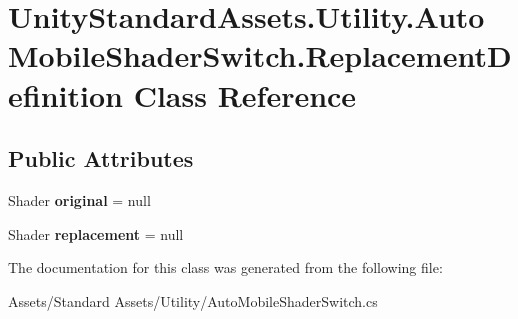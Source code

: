 \hypertarget{class_unity_standard_assets_1_1_utility_1_1_auto_mobile_shader_switch_1_1_replacement_definition}{}\section{Unity\+Standard\+Assets.\+Utility.\+Auto\+Mobile\+Shader\+Switch.\+Replacement\+Definition Class Reference}
\label{class_unity_standard_assets_1_1_utility_1_1_auto_mobile_shader_switch_1_1_replacement_definition}
\subsection*{Public Attributes}
\begin{DoxyCompactItemize}
\item 
Shader {\bfseries original} = null\hypertarget{class_unity_standard_assets_1_1_utility_1_1_auto_mobile_shader_switch_1_1_replacement_definition_aedda6be7e719ff5127ba07a7c194359f}{}\label{class_unity_standard_assets_1_1_utility_1_1_auto_mobile_shader_switch_1_1_replacement_definition_aedda6be7e719ff5127ba07a7c194359f}

\item 
Shader {\bfseries replacement} = null\hypertarget{class_unity_standard_assets_1_1_utility_1_1_auto_mobile_shader_switch_1_1_replacement_definition_aa969ba1a979e7f9b4364fa9d9c4de934}{}\label{class_unity_standard_assets_1_1_utility_1_1_auto_mobile_shader_switch_1_1_replacement_definition_aa969ba1a979e7f9b4364fa9d9c4de934}

\end{DoxyCompactItemize}


The documentation for this class was generated from the following file\+:\begin{DoxyCompactItemize}
\item 
Assets/\+Standard Assets/\+Utility/Auto\+Mobile\+Shader\+Switch.\+cs\end{DoxyCompactItemize}
